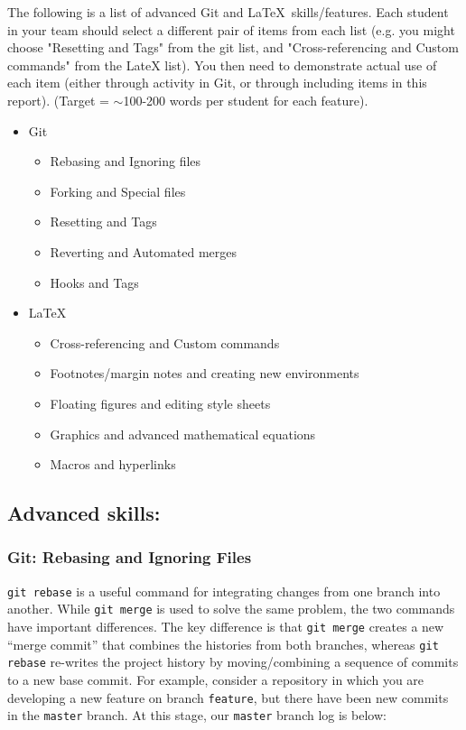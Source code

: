 \documentclass[a4paper, 11pt]{report}
\begin{document}
The following is a list of advanced Git and \LaTeX\ skills/features. Each student in your team should select a different pair of items from each list (e.g. you might choose "Resetting and Tags" from the git list, and "Cross-referencing and Custom commands" from the LateX list). You then need to demonstrate actual use of each item (either through activity in Git, or through including items in this report). (Target = $\sim$100-200 words per student for each feature).
\begin{itemize}
	\item Git
	\begin{itemize}
		\item Rebasing and Ignoring files
		\item Forking and Special files
		\item Resetting and Tags
		\item Reverting and Automated merges
		\item Hooks and Tags
	\end{itemize}
	\item \LaTeX\ 
	\begin{itemize}
		\item Cross-referencing and Custom commands
		\item Footnotes/margin notes and creating new environments
		\item Floating figures and editing style sheets
		\item Graphics and advanced mathematical equations
		\item Macros and hyperlinks
	\end{itemize}
\end{itemize}

\subsection{Advanced skills: \studA}

\subsubsection{Git: Rebasing and Ignoring Files}

\verb|git rebase| is a useful command for integrating changes from one branch into another. While \verb|git merge| is used to solve the same problem, the two commands have important differences. The key difference is that \verb|git merge| creates a new “merge commit” that combines the histories from both branches, whereas \verb|git rebase| re-writes the project history by moving/combining a sequence of commits to a new base commit. For example, consider a repository in which you are developing a new feature on branch \verb|feature|, but there have been new commits in the \verb|master| branch. At this stage, our \verb|master| branch log is below:
\end{document}
